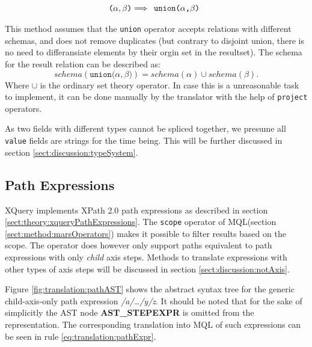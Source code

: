 \begin{equation}
\centering
\texttt{(} \alpha , \beta \texttt{)}
\Longrightarrow
\begin{array}{l}
\mbox{\texttt{union(}} 
\alpha \mbox{\texttt{,}} 
\beta \mbox{\texttt{)}}
\end{array}
\label{eq:translation:sequencing}
\end{equation}

This method assumes that the \texttt{union} operator accepts relations with
different schemas, and does not remove duplicates (but contrary to disjoint
union, there is no need to differansiate elements by their orgin set in the
resultset). The schema for the result relation can be described as:
\begin{equation*}
schema(\texttt{union(}\alpha, \beta\texttt{)}) = schema(\alpha) \cup
schema(\beta).
\end{equation*}
Where $\cup$ is the ordinary set theory operator. In case this is a
unreasonable task to implement, it can be done manually by the translator with
the help of \texttt{project} operators.

As two fields with different types cannot be spliced together, we presume all
\texttt{value} fields are strings for the time being. This will be further
discussed in section \ref{sect:discussion:typeSystem}.

\subsection{Path Expressions}
\label{sect:translation:smpPathExpr}
XQuery implements XPath 2.0 path expressions as described in section
\ref{sect:theory:xqueryPathExpressions}. The \texttt{scope} operator of
MQL(section \ref{sect:method:marsOperators}) makes it possible to
filter results based on the scope. The operator does however only support paths
equivalent to path expressions with only \textit{child} axis steps. Methods to
translate expressions with other types of axis steps will be discussed in
section \ref{sect:discussion:notAxis}.

Figure \ref{fig:translation:pathAST} shows the abstract syntax tree for the
generic child-axis-only path expression \textit{/a/\ldots/y/z}. It should be
noted that for the sake of simplicitly the AST node \textbf{AST\_STEPEXPR} is
omitted from the representation. The corresponding translation into MQL of such
expressions can be seen in rule \ref{eq:translation:pathExpr}.


